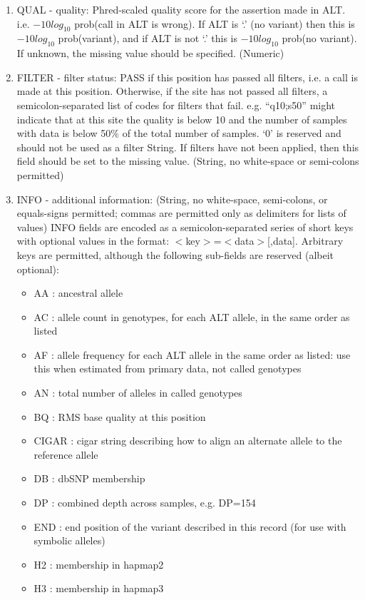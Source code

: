 \documentclass[8pt]{article}
\begin{document}
\begin{enumerate}
  \item QUAL - quality: Phred-scaled quality score for the assertion made in ALT. i.e. $-10log_{10}$ prob(call in ALT is wrong). If ALT is `.' (no variant) then this is $-10log_{10}$ prob(variant), and if ALT is not `.' this is $-10log_{10}$ prob(no variant). If unknown, the missing value should be specified. (Numeric)
  \item FILTER - filter status: PASS if this position has passed all filters, i.e. a call is made at this position. Otherwise, if the site has not passed all filters, a semicolon-separated list of codes for filters that fail. e.g. ``q10;s50'' might indicate that at this site the quality is below 10 and the number of samples with data is below 50\% of the total number of samples. `0' is reserved and should not be used as a filter String. If filters have not been applied, then this field should be set to the missing value. (String, no white-space or semi-colons permitted)
  \item INFO - additional information: (String, no white-space, semi-colons, or equals-signs permitted; commas are permitted only as delimiters for lists of values) INFO fields are encoded as a semicolon-separated series of short keys with optional values in the format: $<$key$>$=$<$data$>$[,data]. Arbitrary keys are permitted, although the following sub-fields are reserved (albeit optional):
\begin{itemize}
  \item AA : ancestral allele
  \item AC : allele count in genotypes, for each ALT allele, in the same order as listed
  \item AF : allele frequency for each ALT allele in the same order as listed: use this when estimated from primary data, not called genotypes
  \item AN : total number of alleles in called genotypes
  \item BQ : RMS base quality at this position
  \item CIGAR : cigar string describing how to align an alternate allele to the reference allele
  \item DB : dbSNP membership
  \item DP : combined depth across samples, e.g. DP=154
  \item END : end position of the variant described in this record (for use with symbolic alleles)
  \item H2 : membership in hapmap2
  \item H3 : membership in hapmap3

\end{itemize}
\end{enumerate}
\end{document}
